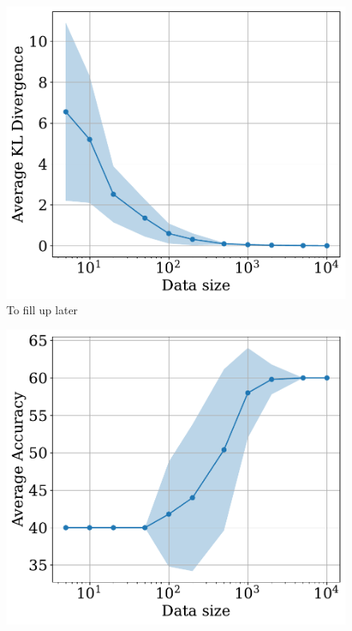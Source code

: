 \begin{figure}
\begin{minipage}{0.4\textwidth}
    \includegraphics[width = \linewidth]{plots/joint_dist_div.pdf}
    \end{minipage}
    \caption{To fill up later}
    \label{fig:lineplot}
\end{figure}

\begin{figure}
\centering
    \begin{minipage}{0.4\textwidth}
    \includegraphics[width = \linewidth]{plots/accuracy.pdf}
    \end{minipage}
\end{figure}